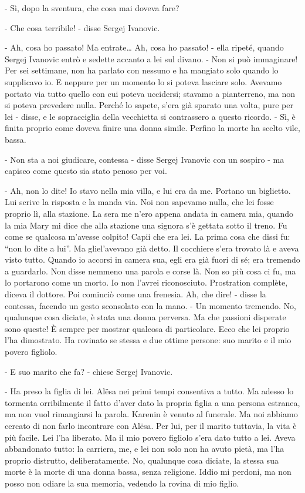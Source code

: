 - Sì, dopo la sventura, che cosa mai doveva fare? 

- Che cosa terribile! - disse Sergej Ivanovic. 

- Ah, cosa ho passato! Ma entrate\ldots{} Ah, cosa ho passato! - ella ripeté, quando Sergej Ivanovic entrò e sedette accanto a lei sul divano. - Non si può immaginare! Per sei settimane, non ha parlato con nessuno e ha mangiato solo quando lo supplicavo io. E neppure per un momento lo si poteva lasciare solo. Avevamo portato via tutto quello con cui poteva uccidersi; stavamo a pianterreno, ma non si poteva prevedere nulla. Perché lo sapete, s'era già sparato una volta, pure per lei - disse, e le sopracciglia della vecchietta si contrassero a questo ricordo. - Sì, è finita proprio come doveva finire una donna simile. Perfino la morte ha scelto vile, bassa. 

- Non sta a noi giudicare, contessa - disse Sergej Ivanovic con un sospiro - ma capisco come questo sia stato penoso per voi. 

- Ah, non lo dite! Io stavo nella mia villa, e lui era da me. Portano un biglietto. Lui scrive la risposta e la manda via. Noi non sapevamo nulla, che lei fosse proprio lì, alla stazione. La sera me n'ero appena andata in camera mia, quando la mia Mary mi dice che alla stazione una signora s'è gettata sotto il treno. Fu come se qualcosa m'avesse colpito! Capii che era lei. La prima cosa che dissi fu: ``non lo dite a lui''. Ma gliel'avevano già detto. Il cocchiere s'era trovato là e aveva visto tutto. Quando io accorsi in camera sua, egli era già fuori di sé; era tremendo a guardarlo. Non disse nemmeno una parola e corse là. Non so più cosa ci fu, ma lo portarono come un morto. Io non l'avrei riconosciuto. Prostration complète, diceva il dottore. Poi cominciò come una frenesia. Ah, che dire! - disse la contessa, facendo un gesto sconsolato con la mano. - Un momento tremendo. No, qualunque cosa diciate, è stata una donna perversa. Ma che passioni disperate sono queste! È sempre per mostrar qualcosa di particolare. Ecco che lei proprio l'ha dimostrato. Ha rovinato se stessa e due ottime persone: suo marito e il mio povero figliolo. 

- E suo marito che fa? - chiese Sergej Ivanovic. 

- Ha preso la figlia di lei. Alësa nei primi tempi consentiva a tutto. Ma adesso lo tormenta orribilmente il fatto d'aver dato la propria figlia a una persona estranea, ma non vuol rimangiarsi la parola. Karenin è venuto al funerale. Ma noi abbiamo cercato di non farlo incontrare con Alësa. Per lui, per il marito tuttavia, la vita è più facile. Lei l'ha liberato. Ma il mio povero figliolo s'era dato tutto a lei. Aveva abbandonato tutto: la carriera, me, e lei non solo non ha avuto pietà, ma l'ha proprio distrutto, deliberatamente. No, qualunque cosa diciate, la stessa sua morte è la morte di una donna bassa, senza religione. Iddio mi perdoni, ma non posso non odiare la sua memoria, vedendo la rovina di mio figlio. 

